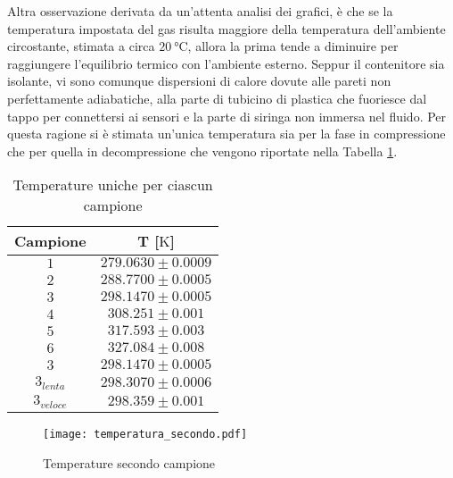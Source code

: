 \documentclass[a4paper,11pt,oneside]{article}
\begin{document}
Altra osservazione derivata da un'attenta analisi dei grafici, è che se la temperatura impostata del gas risulta maggiore della temperatura dell'ambiente circostante, stimata a circa $\SI{20}{\celsius}$, allora la prima tende a diminuire per raggiungere l'equilibrio termico con l'ambiente esterno. Seppur il contenitore sia isolante, vi sono comunque dispersioni di calore dovute alle pareti non perfettamente adiabatiche, alla parte di tubicino di plastica che fuoriesce dal tappo per connettersi ai sensori e la parte di siringa non immersa nel fluido. Per questa ragione si è stimata un'unica temperatura sia per la fase in compressione che per quella in decompressione che vengono riportate nella Tabella \ref{tab:temp_unica}.

\begin{table}[h!]
    \centering
    \begin{tabular}{|c|c|}
        \hline
        \textbf{Campione} & \textbf{T} [$\si{\kelvin}$] \\ \hline
        \rowcolor[rgb]{0.85,0.85,0.85}$1$ & $279.0630\pm0.0009$ \\ \hline
        $2$ & $288.7700\pm0.0005$ \\ \hline
        \rowcolor[rgb]{0.85,0.85,0.85}$3$ & $298.1470\pm0.0005$ \\ \hline
        $4$ & $308.251\pm0.001$ \\ \hline
        \rowcolor[rgb]{0.85,0.85,0.85}$5$ & $317.593\pm0.003$ \\ \hline
        $6$ & $327.084\pm0.008$ \\ \hline \hline
        \rowcolor[rgb]{0.85,0.85,0.85}$3$ & $298.1470\pm0.0005$ \\ \hline
        $3_{lenta}$ & $298.3070\pm0.0006$ \\ \hline
        \rowcolor[rgb]{0.85,0.85,0.85}$3_{veloce}$ & $298.359\pm0.001$ \\ \hline
    \end{tabular}
    \caption{Temperature uniche per ciascun campione}
    \label{tab:temp_unica}
\end{table}


\begin{figure}[h!]
    \centering
    \texttt{[image: temperatura\_secondo.pdf]}
    \caption{Temperature secondo campione}
    \label{fig:campione_temperatura}
\end{figure}

\end{document}
